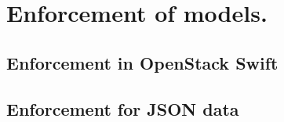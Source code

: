 \chapter{Enforcement of \eapABAC{} models.}

\section{Enforcement in OpenStack Swift}
\section{Enforcement for JSON data}